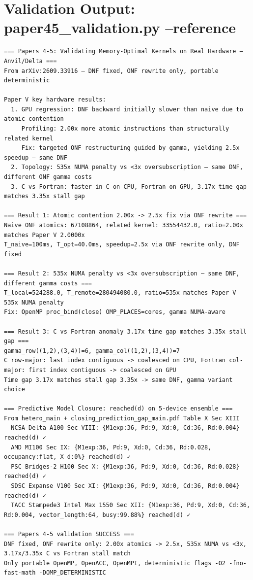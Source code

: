 \documentclass[11pt]{article}
\begin{document}
\section{Validation Output: paper45\_validation.py --reference}
\begin{lstlisting}
=== Papers 4-5: Validating Memory-Optimal Kernels on Real Hardware — Anvil/Delta ===
From arXiv:2609.33916 — DNF fixed, ONF rewrite only, portable deterministic

Paper V key hardware results:
  1. GPU regression: DNF backward initially slower than naive due to atomic contention
     Profiling: 2.00x more atomic instructions than structurally related kernel
     Fix: targeted ONF restructuring guided by gamma, yielding 2.5x speedup — same DNF
  2. Topology: 535x NUMA penalty vs <3x oversubscription — same DNF, different ONF gamma costs
  3. C vs Fortran: faster in C on CPU, Fortran on GPU, 3.17x time gap matches 3.35x stall gap

=== Result 1: Atomic contention 2.00x -> 2.5x fix via ONF rewrite ===
Naive ONF atomics: 67108864, related kernel: 33554432.0, ratio=2.00x matches Paper V 2.0000x
T_naive=100ms, T_opt=40.0ms, speedup=2.5x via ONF rewrite only, DNF fixed

=== Result 2: 535x NUMA penalty vs <3x oversubscription — same DNF, different gamma costs ===
T_local=524288.0, T_remote=280494080.0, ratio=535x matches Paper V 535x NUMA penalty
Fix: OpenMP proc_bind(close) OMP_PLACES=cores, gamma NUMA-aware

=== Result 3: C vs Fortran anomaly 3.17x time gap matches 3.35x stall gap ===
gamma_row((1,2),(3,4))=6, gamma_col((1,2),(3,4))=7
C row-major: last index contiguous -> coalesced on CPU, Fortran col-major: first index contiguous -> coalesced on GPU
Time gap 3.17x matches stall gap 3.35x -> same DNF, gamma variant choice

=== Predictive Model Closure: reached(d) on 5-device ensemble ===
From hetero_main + closing_prediction_gap_main.pdf Table X Sec XIII
  NCSA Delta A100 Sec VIII: {M1exp:36, Pd:9, Xd:0, Cd:36, Rd:0.004} reached(d) ✓
  AMD MI100 Sec IX: {M1exp:36, Pd:9, Xd:0, Cd:36, Rd:0.028, occupancy:flat, X_d:0%} reached(d) ✓
  PSC Bridges-2 H100 Sec X: {M1exp:36, Pd:9, Xd:0, Cd:36, Rd:0.028} reached(d) ✓
  SDSC Expanse V100 Sec XI: {M1exp:36, Pd:9, Xd:0, Cd:36, Rd:0.004} reached(d) ✓
  TACC Stampede3 Intel Max 1550 Sec XII: {M1exp:36, Pd:9, Xd:0, Cd:36, Rd:0.004, vector_length:64, busy:99.88%} reached(d) ✓

=== Papers 4-5 validation SUCCESS ===
DNF fixed, ONF rewrite only: 2.00x atomics -> 2.5x, 535x NUMA vs <3x, 3.17x/3.35x C vs Fortran stall match
Only portable OpenMP, OpenACC, OpenMPI, deterministic flags -O2 -fno-fast-math -DOMP_DETERMINISTIC

\end{lstlisting}
\end{document}
